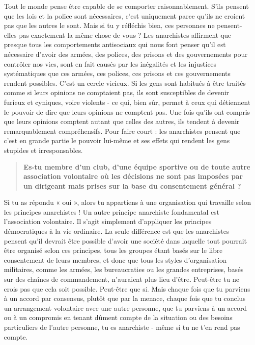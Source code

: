 Tout le monde pense être capable de se comporter raisonnablement. S'ils pensent que les lois et la police sont nécessaires, c'est uniquement parce qu'ils ne croient pas que les autres le sont. Mais si tu y réfléchis bien, ces personnes ne pensent-elles pas exactement la même chose de vous ? Les anarchistes affirment que presque tous les comportements antisociaux qui nous font penser qu'il est nécessaire d'avoir des armées, des polices, des prisons et des gouvernements pour contrôler nos vies, sont en fait causés par les inégalités et les injustices systématiques que ces armées, ces polices, ces prisons et ces gouvernements rendent possibles. C'est un cercle vicieux. Si les gens sont habitués à être traités comme si leurs opinions ne comptaient pas, ils sont susceptibles de devenir furieux et cyniques, voire violents - ce qui, bien sûr, permet à ceux qui détiennent le pouvoir de dire que leurs opinions ne comptent pas. Une fois qu'ils ont compris que leurs opinions comptent autant que celles des autres, ils tendent à devenir remarquablement compréhensifs. Pour faire court : les anarchistes pensent que c'est en grande partie le pouvoir lui-même et ses effets qui rendent les gens stupides et irresponsables.

\begin{quotation}
\textbf{Es-tu membre d'un club, d'une équipe sportive ou de toute autre association volontaire où les décisions ne sont pas imposées par un dirigeant mais prises sur la base du consentement général ?}
\end{quotation}

Si tu as répondu « oui », alors tu appartiens à une organisation qui travaille selon les principes anarchistes ! Un autre principe anarchiste fondamental est l'association volontaire. Il s'agit simplement d'appliquer les principes démocratiques à la vie ordinaire. La seule différence est que les anarchistes pensent qu'il devrait être possible d'avoir une société dans laquelle tout pourrait être organisé selon ces principes, tous les groupes étant basés sur le libre consentement de leurs membres, et donc que tous les styles d'organisation militaires, comme les armées, les bureaucraties ou les grandes entreprises, basés sur des chaînes de commandement, n'auraient plus lieu d'être. Peut-être tu ne crois pas que cela soit possible. Peut-être que si. Mais chaque fois que tu parviens à un accord par consensus, plutôt que par la menace, chaque fois que tu conclus un arrangement volontaire avec une autre personne, que tu parviens à un accord ou à un compromis en tenant dûment compte de la situation ou des besoins particuliers de l'autre personne, tu es anarchiste - même si tu ne t’en rend pas compte.

